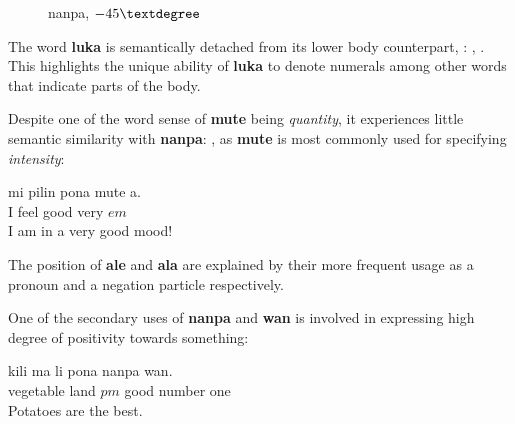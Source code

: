 \documentclass[14pt, a4paper]{extreport}
\makeatletter
\DeclareRobustCommand\ttfamily
        {\not@math@alphabet\ttfamily\mathtt
         \fontfamily\ttdefault\small\selectfont}
\makeatother
\begin{document}
\begin{figure}[ht]%
  \def\angle{-45}
  \bigskip
  \centering
  \caption{nanpa, \(\angle\textdegree\)}
\end{figure}%

The word \textbf{luka} is semantically detached from its lower body counterpart, : , . This highlights the unique ability of \textbf{luka} to denote numerals among other words that indicate parts of the body.

Despite one of the word sense of \textbf{mute} being \textit{quantity}, it experiences little semantic similarity with \textbf{nanpa}: , as \textbf{mute} is most commonly used for specifying \textit{intensity}:

\begin{exe}
  \ex
  \gll mi pilin pona mute a. \\
       I feel good very $em$ \\
  \glt I am in a very good mood!
\end{exe}

The position of \textbf{ale} and \textbf{ala} are explained by their more frequent usage as a pronoun and a negation particle respectively.

One of the secondary uses of \textbf{nanpa} and \textbf{wan} is involved in expressing high degree of positivity towards something:

\begin{exe}
  \ex
  \gll kili ma li pona nanpa wan. \\
       vegetable land $pm$ good number one \\
  \glt Potatoes are the best.
\end{exe}
\end{document}

